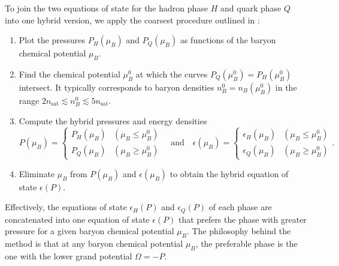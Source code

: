 To join the two equations of state for the hadron phase $H$ and quark phase $Q$ into one hybrid version,
we apply the coarsest procedure outlined in \cite[section V-C]{ref:quark_star_review}:
\begin{enumerate}
\item \label{step:hybrid:one}%
      Plot the pressures $P_H(\mu_B)$ and $P_Q(\mu_B)$ as functions of the baryon chemical potential $\mu_B$.
\item \label{step:hybrid:two}%
      Find the chemical potential $\mu_B^0$ at which the curves $P_Q(\mu_B^0) = P_H(\mu_B^0)$ intersect.
      It typically corresponds to baryon densities $n_B^0 = n_B(\mu_B^0)$ in the range $2 n_\text{sat} \lesssim n_B^0 \lesssim 5 n_\text{sat}$.
\item \label{step:hybrid:three}%
      Compute the hybrid pressures and energy densities
      \begin{equation}
          P(\mu_B) = \begin{cases} P_H(\mu_B) & (\mu_B \leq \mu_B^0) \\ P_Q(\mu_B) & (\mu_B \geq \mu_B^0)  \end{cases}
          \quad \text{and} \quad
          \epsilon(\mu_B) = \begin{cases} \epsilon_H(\mu_B) & (\mu_B \leq \mu_B^0) \\ \epsilon_Q(\mu_B) & (\mu_B \geq \mu_B^0) \end{cases}.
      \label{eq:hybrid:pressure_energy_density}
      \end{equation}
\item \label{step:hybrid:four}%
      Eliminate $\mu_B$ from $P(\mu_B)$ and $\epsilon(\mu_B)$ to obtain the hybrid equation of state $\epsilon(P)$.
\end{enumerate}
Effectively, the equations of state $\epsilon_H(P)$ and $\epsilon_Q(P)$ of each phase are concatenated into one equation of state $\epsilon(P)$
that prefers the phase with greater pressure for a given baryon chemical potential $\mu_B$.
The philosophy behind the method is that at any baryon chemical potential $\mu_B$,
the preferable phase is the one with the lower grand potential $\Omega = -P$.

